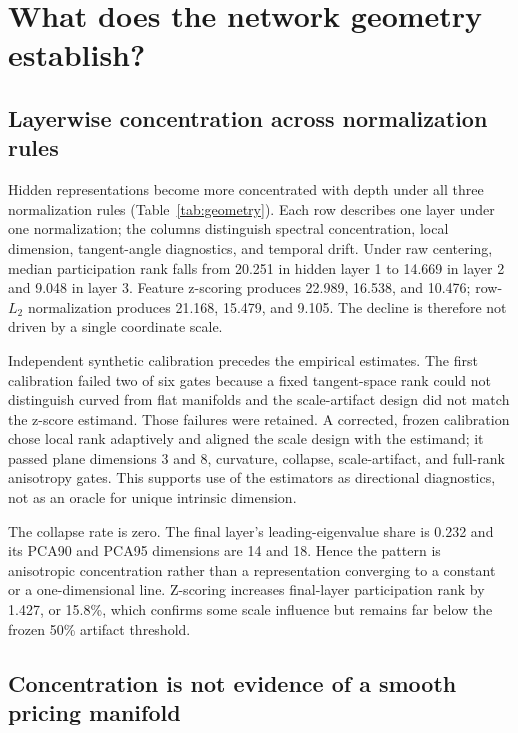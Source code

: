 \section{What does the network geometry establish?}

\subsection{Layerwise concentration across normalization rules}

Hidden representations become more concentrated with depth under all three normalization rules (Table~\ref{tab:geometry}). Each row describes one layer under one normalization; the columns distinguish spectral concentration, local dimension, tangent-angle diagnostics, and temporal drift. Under raw centering, median participation rank falls from 20.251 in hidden layer 1 to 14.669 in layer 2 and 9.048 in layer 3. Feature z-scoring produces 22.989, 16.538, and 10.476; row-$L_2$ normalization produces 21.168, 15.479, and 9.105. The decline is therefore not driven by a single coordinate scale.



Independent synthetic calibration precedes the empirical estimates. The first calibration failed two of six gates because a fixed tangent-space rank could not distinguish curved from flat manifolds and the scale-artifact design did not match the z-score estimand. Those failures were retained. A corrected, frozen calibration chose local rank adaptively and aligned the scale design with the estimand; it passed plane dimensions 3 and 8, curvature, collapse, scale-artifact, and full-rank anisotropy gates. This supports use of the estimators as directional diagnostics, not as an oracle for unique intrinsic dimension.

The collapse rate is zero. The final layer's leading-eigenvalue share is 0.232 and its PCA90 and PCA95 dimensions are 14 and 18. Hence the pattern is anisotropic concentration rather than a representation converging to a constant or a one-dimensional line. Z-scoring increases final-layer participation rank by 1.427, or 15.8\%, which confirms some scale influence but remains far below the frozen 50\% artifact threshold.

\subsection{Concentration is not evidence of a smooth pricing manifold}

